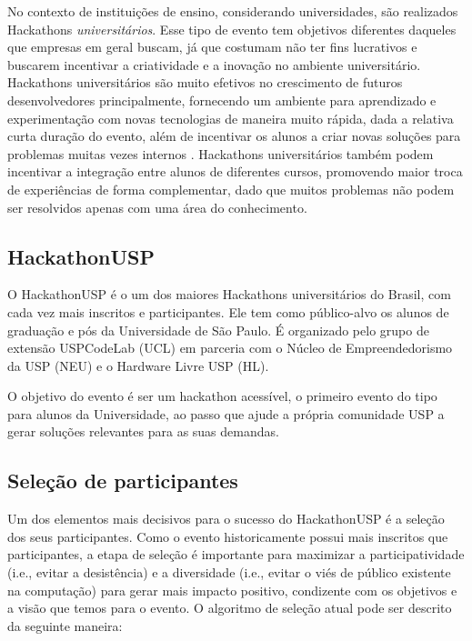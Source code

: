 \documentclass[10pt,twoside,a4paper]{article}
\begin{document}
    No contexto de instituições de ensino, considerando universidades, são realizados Hackathons \textit{universitários}. Esse tipo de evento tem objetivos diferentes daqueles que empresas em geral buscam, já que costumam não ter fins lucrativos e buscarem incentivar a criatividade e a inovação no ambiente universitário. Hackathons universitários são muito efetivos no crescimento de futuros desenvolvedores principalmente, fornecendo um ambiente para aprendizado e experimentação com novas tecnologias de maneira muito rápida, dada a relativa curta duração do evento, além de incentivar os alunos a criar novas soluções para problemas muitas vezes internos \cite{Kayastha2017EnablingCompetition}. Hackathons universitários também podem incentivar a integração entre alunos de diferentes cursos, promovendo maior troca de experiências de forma complementar, dado que muitos problemas não podem ser resolvidos apenas com uma área do conhecimento.

  \subsection{HackathonUSP}
    
    O HackathonUSP é o um dos maiores Hackathons universitários do Brasil, com cada vez mais inscritos e participantes. Ele tem como  público-alvo os alunos de graduação e pós da Universidade de São Paulo. É organizado pelo grupo de extensão USPCodeLab (UCL) em parceria com o Núcleo de Empreendedorismo da USP (NEU) e o Hardware Livre USP (HL).
    
    O objetivo do evento é ser um hackathon acessível, o primeiro evento do tipo para alunos da Universidade, ao passo que ajude a própria comunidade USP a gerar soluções relevantes para as suas demandas.
    
\subsection{Seleção de participantes}
    
    Um dos elementos mais decisivos para o sucesso do HackathonUSP é a seleção dos seus participantes. Como o evento historicamente possui mais inscritos que participantes, a etapa de seleção é importante para maximizar a participatividade (i.e., evitar a desistência) e a diversidade (i.e., evitar o viés de público existente na computação) para gerar mais impacto positivo, condizente com os objetivos e a visão que temos para o evento.
    O algoritmo de seleção atual pode ser descrito da seguinte maneira: \\
    
\end{document}
